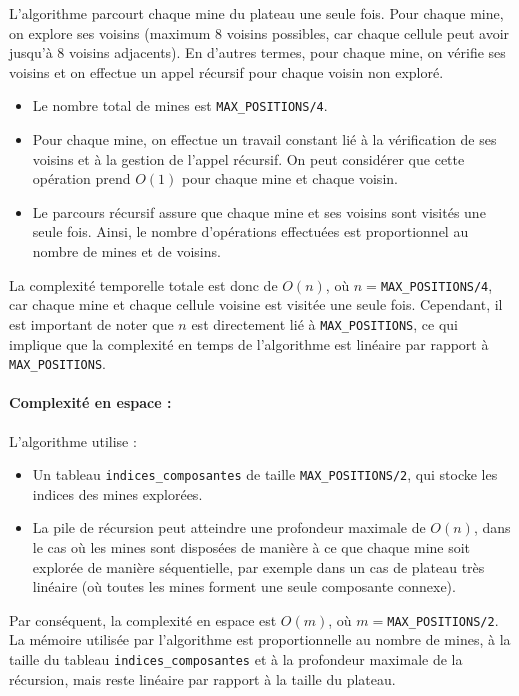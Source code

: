 \documentclass[a4paper,12pt]{report}
\begin{document}
L'algorithme parcourt chaque mine du plateau une seule fois. Pour chaque mine, on explore ses voisins (maximum 8 voisins possibles, car chaque cellule peut 
avoir jusqu'à 8 voisins adjacents). En d'autres termes, pour chaque mine, on vérifie ses voisins et on effectue un appel récursif pour chaque voisin non 
exploré.

\begin{itemize}
    \item Le nombre total de mines est \texttt{MAX\_POSITIONS/4}.
    \item Pour chaque mine, on effectue un travail constant lié à la vérification de ses voisins et à la gestion de l'appel récursif. 
    On peut considérer que cette opération prend \( O(1) \) pour chaque mine et chaque voisin.
    \item Le parcours récursif assure que chaque mine et ses voisins sont visités une seule fois. Ainsi, le nombre d'opérations effectuées est proportionnel 
    au nombre de mines et de voisins.
\end{itemize}

La complexité temporelle totale est donc de \( O(n) \), où \(n=\)\texttt{MAX\_POSITIONS/4}, car chaque mine et chaque cellule voisine est visitée une 
seule fois. Cependant, il est important de noter que \( n \) est directement lié à \texttt{MAX\_POSITIONS}, ce qui implique que la complexité en 
temps de l'algorithme est linéaire par rapport à \texttt{MAX\_POSITIONS}.

\paragraph{Complexité en espace :}

L'algorithme utilise :
\begin{itemize}
    \item Un tableau \texttt{indices\_composantes} de taille \texttt{MAX\_POSITIONS/2}, qui stocke les indices des mines explorées.
    \item La pile de récursion peut atteindre une profondeur maximale de \( O(n) \), dans le cas où les mines sont disposées de manière à ce que chaque mine soit explorée de manière séquentielle, par exemple dans un cas de plateau très linéaire (où toutes les mines forment une seule composante connexe).
\end{itemize}

Par conséquent, la complexité en espace est \( O(m) \), où \(m=\)\texttt{MAX\_POSITIONS/2}. La mémoire utilisée par l'algorithme est proportionnelle 
au nombre de mines, à la taille du tableau \texttt{indices\_composantes} et à la profondeur maximale de la récursion, mais reste linéaire par rapport à la taille du plateau. 
\end{document}
